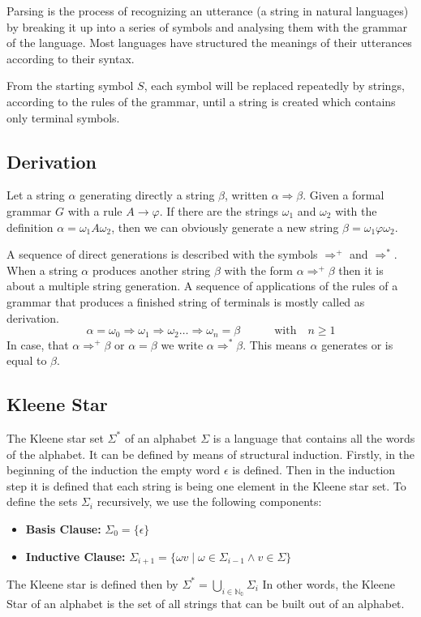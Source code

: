 Parsing is the process of recognizing an utterance (a string in natural languages) by breaking it up into a series of symbols and analysing them with the grammar of the language. Most languages have structured the meanings of their utterances according to their syntax.

From the starting symbol $S$, each symbol will be replaced repeatedly by strings, according to the rules of the grammar, until a string is created which contains only terminal symbols.

\subsection{Derivation}
Let a string $\alpha$ generating directly a string $\beta$, written $\alpha \Rightarrow \beta$. Given a formal grammar $G$ with a rule $A \rightarrow \varphi$. If there are the strings $\omega_1$ and $\omega_2$ with the definition $\alpha = \omega_1A\omega_2$, then we can obviously generate a new string $\beta = \omega_1\varphi\omega_2$.
 
A sequence of direct generations is described with the symbols $\Rightarrow^+$ and $\Rightarrow^*$. When a string $\alpha$ produces another string $\beta$ with the form $\alpha \Rightarrow^+ \beta$ then it is about a multiple string generation. A sequence of applications of the rules of a grammar that produces a finished string of terminals is mostly called as derivation. 
$$\alpha = \omega_0 \Rightarrow \omega_1 \Rightarrow \omega_2 \ldots \Rightarrow \omega_n = \beta \qquad \quad \textrm{with} \quad n \geq 1$$ 
In case, that $\alpha \Rightarrow^+ \beta$ or $\alpha = \beta$ we write $\alpha \Rightarrow^* \beta$. This means $\alpha$ generates or is equal to $\beta$.

\subsection{Kleene Star}
The Kleene star set $\Sigma^*$ of an alphabet $\Sigma$ is a language that contains all the words of the alphabet. It can be defined by means of structural induction. 
Firstly, in the beginning of the induction the empty word $\epsilon$ is defined. Then in the induction step it is defined that each string is being one element in the Kleene star set.
To define the sets $\Sigma_i$ recursively, we use the following components:
\begin{itemize}
\item \textbf{Basis Clause: }$\Sigma_0 = \{\epsilon\}$ 
\item \textbf{Inductive Clause: }$\Sigma_{i+1} = \{\omega v \mid \omega\in\Sigma_{i-1}\wedge v\in\Sigma\}$
\end{itemize}
The Kleene star is defined then by $\Sigma^* = \bigcup\limits_{i\in\mathbb{N_0}} \Sigma_{i}$
In other words, the Kleene Star of an alphabet is the set of all strings that can be built out of an alphabet.

